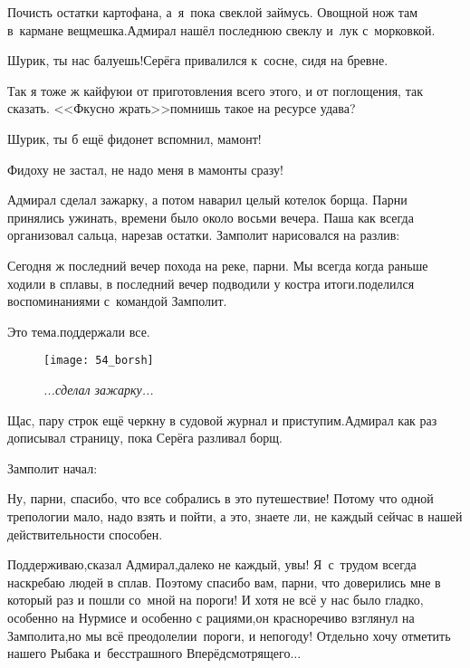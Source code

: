 \diagdash Почисть остатки картофана, а~я~пока свеклой займусь. Овощной нож там в~кармане вещмешка.\mdash Адмирал нашёл последнюю свеклу и~лук с~морковкой.

\diagdash Шурик, ты нас балуешь!\mdash Серёга привалился к~сосне, сидя на бревне.

\diagdash Так я тоже ж кайфую\mdash и от приготовления всего этого, и от поглощения, так сказать. <<Фкусно жрать>>\mdash помнишь такое на ресурсе удава?

\diagdash Шурик, ты б ещё фидонет вспомнил, мамонт!

\diagdash Фидоху не застал, не надо меня в мамонты сразу!

Адмирал сделал зажарку, а потом наварил целый котелок борща. Парни принялись ужинать, времени было около восьми вечера. Паша как всегда организовал сальца, нарезав остатки. Замполит нарисовался на разлив:

\diagdash Сегодня ж последний вечер похода на реке, парни. Мы всегда когда раньше ходили в сплавы, в последний вечер подводили у костра итоги.\mdash поделился воспоминаниями с~командой Замполит.

\diagdash Это тема.\mdash поддержали все.

\begin{wrapfigure}[18]{l}{0.50\textwidth}
	\centering
	\texttt{[image: 54\_borsh]}
	\caption{\small\textit{...сделал зажарку...}}
\end{wrapfigure}
\mdash Щас, пару строк ещё черкну в судовой журнал и приступим.\mdash Адмирал как раз дописывал страницу, пока Серёга разливал борщ.

Замполит начал:

\diagdash Ну, парни, спасибо, что все собрались в это путешествие! Потому что одной трепологии мало, надо взять и пойти, а это, знаете ли, не каждый сейчас в нашей действительности способен. %

\diagdash Поддерживаю,\mdash сказал Адмирал,\mdash далеко не каждый, увы! Я~с~трудом всегда наскребаю людей в сплав. Поэтому спасибо вам, парни, что доверились мне в который раз и пошли со~мной на пороги! И хотя не всё у нас было гладко, особенно на Нурмисе и особенно с рациями,\mdash он красноречиво взглянул на Замполита,\mdash но мы всё преодолели\mdash и~пороги, и непогоду! Отдельно хочу отметить нашего Рыбака и~бесстрашного Вперёдсмотрящего$\ldots$

